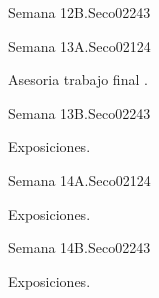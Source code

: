 \begin{syllabus}
\begin{unit}{Semana 12B.}{Seco02}{24}{3}
   \begin{unitgoals}
      \item 
      \item
      \item 
      \end{unitgoals}
\end{unit}


\begin{unit}{Semana 13A.}{Seco02}{12}{4}
   \begin{topics}
      \item Asesoria trabajo final .
   \end{topics}
   \begin{unitgoals}
      \item 
   \end{unitgoals}
\end{unit}

\begin{unit}{Semana 13B.}{Seco02}{24}{3}
   \begin{topics}
      \item Exposiciones.
   \end{topics}

   \begin{unitgoals}
      \item 
      \item
      \item 
      \end{unitgoals}
\end{unit}


\begin{unit}{Semana 14A.}{Seco02}{12}{4}
   \begin{topics}
      \item Exposiciones.
   \end{topics}
   \begin{unitgoals}
      \item 
   \end{unitgoals}
\end{unit}

\begin{unit}{Semana 14B.}{Seco02}{24}{3}
   \begin{topics}
      \item Exposiciones.
   \end{topics}

   \begin{unitgoals}
      \item 
      \item
      \item 
      \end{unitgoals}
\end{unit}


\end{syllabus}
